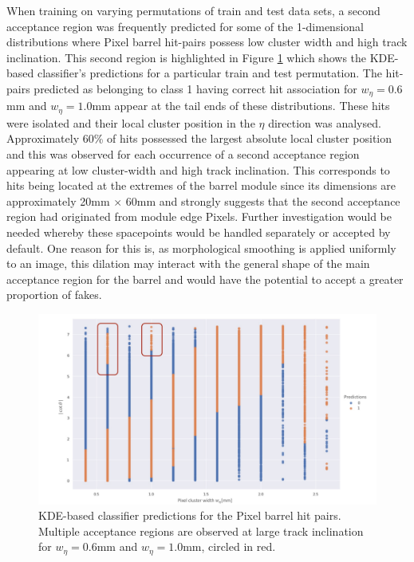 When training on varying permutations of train and test data sets, a second acceptance region was frequently predicted for some of the 1-dimensional distributions where Pixel barrel hit-pairs possess low cluster width and high track inclination. This second region is highlighted in Figure \ref{fig:multiple-acceptance} which shows the KDE-based classifier's predictions for a particular train and test permutation. The hit-pairs predicted as belonging to class 1 having correct hit association for $w_{\eta} = 0.6$mm and $w_{\eta} = 1.0$mm appear at the tail ends of these distributions. These hits were isolated and their local cluster position in the $\eta$ direction was analysed. Approximately 60\% of hits possessed the largest absolute local cluster position and this was observed for each occurrence of a second acceptance region appearing at low cluster-width and high track inclination. This corresponds to hits being located at the extremes of the barrel module since its dimensions are approximately 20mm $\times$ 60mm \cite{pixel-module-dimensions} and strongly suggests that the second acceptance region had originated from module edge Pixels. Further investigation would be needed whereby these spacepoints would be handled separately or accepted by default. One reason for this is, as morphological smoothing is applied uniformly to an image, this dilation may interact with the general shape of the main acceptance region for the barrel and would have the potential to accept a greater proportion of fakes.

\begin{figure}[!htbp]
\centering
\includegraphics[width=0.9\linewidth]{images/4-ml-based-predictor/Multiple_acceptance_regions.pdf}
\caption{KDE-based classifier predictions for the Pixel barrel hit pairs. Multiple acceptance regions are observed at large track inclination for $w_{\eta} = 0.6$mm and $w_{\eta} = 1.0$mm, circled in red.}
\label{fig:multiple-acceptance}
\end{figure}


